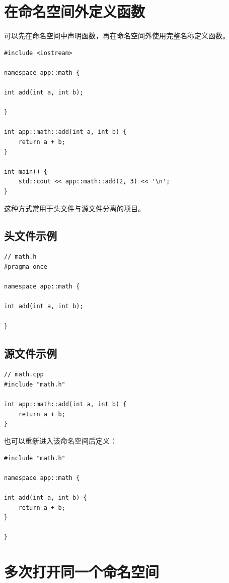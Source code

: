 \documentclass[UTF8,12pt,a4paper]{ctexart}
\begin{document}
\section{在命名空间外定义函数}

可以先在命名空间中声明函数，再在命名空间外使用完整名称定义函数。

\begin{lstlisting}
#include <iostream>

namespace app::math {

int add(int a, int b);

}

int app::math::add(int a, int b) {
    return a + b;
}

int main() {
    std::cout << app::math::add(2, 3) << '\n';
}
\end{lstlisting}

这种方式常用于头文件与源文件分离的项目。

\subsection{头文件示例}

\begin{lstlisting}
// math.h
#pragma once

namespace app::math {

int add(int a, int b);

}
\end{lstlisting}

\subsection{源文件示例}

\begin{lstlisting}
// math.cpp
#include "math.h"

int app::math::add(int a, int b) {
    return a + b;
}
\end{lstlisting}

也可以重新进入该命名空间后定义：

\begin{lstlisting}
#include "math.h"

namespace app::math {

int add(int a, int b) {
    return a + b;
}

}
\end{lstlisting}

\section{多次打开同一个命名空间}
\end{document}
